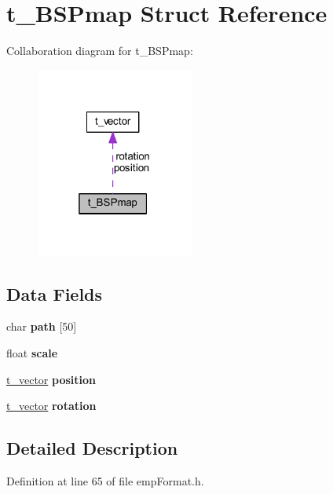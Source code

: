 \hypertarget{structt___b_s_pmap}{}\section{t\+\_\+\+B\+S\+Pmap Struct Reference}
\label{structt___b_s_pmap}


Collaboration diagram for t\+\_\+\+B\+S\+Pmap\+:
\nopagebreak
\begin{figure}[H]
\begin{center}
\leavevmode
\includegraphics[width=148pt]{structt___b_s_pmap__coll__graph}
\end{center}
\end{figure}
\subsection*{Data Fields}
\begin{DoxyCompactItemize}
\item 
char {\bfseries path} \mbox{[}50\mbox{]}\hypertarget{structt___b_s_pmap_ad2073477bed92a5e788f07f723807d6a}{}\label{structt___b_s_pmap_ad2073477bed92a5e788f07f723807d6a}

\item 
float {\bfseries scale}\hypertarget{structt___b_s_pmap_a00f72fb63c6f473aa548cda9145ad5e0}{}\label{structt___b_s_pmap_a00f72fb63c6f473aa548cda9145ad5e0}

\item 
\hyperlink{structt__vector}{t\+\_\+vector} {\bfseries position}\hypertarget{structt___b_s_pmap_acfa77efc70de7100025103097027fed8}{}\label{structt___b_s_pmap_acfa77efc70de7100025103097027fed8}

\item 
\hyperlink{structt__vector}{t\+\_\+vector} {\bfseries rotation}\hypertarget{structt___b_s_pmap_ac8f885e87a0770b8e4cc9db52306882e}{}\label{structt___b_s_pmap_ac8f885e87a0770b8e4cc9db52306882e}

\end{DoxyCompactItemize}


\subsection{Detailed Description}


Definition at line 65 of file emp\+Format.\+h.

